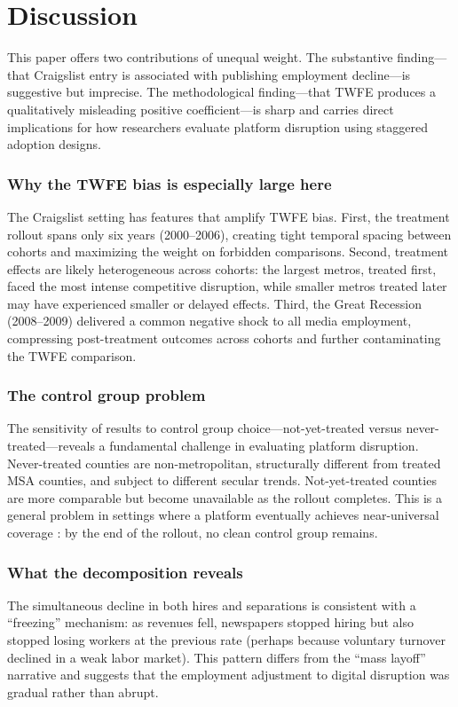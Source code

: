\documentclass[12pt]{article}
\begin{document}



\section{Discussion}

This paper offers two contributions of unequal weight. The substantive finding---that Craigslist entry is associated with publishing employment decline---is suggestive but imprecise. The methodological finding---that TWFE produces a qualitatively misleading positive coefficient---is sharp and carries direct implications for how researchers evaluate platform disruption using staggered adoption designs.

\subsubsection*{Why the TWFE bias is especially large here} The Craigslist setting has features that amplify TWFE bias. First, the treatment rollout spans only six years (2000--2006), creating tight temporal spacing between cohorts and maximizing the weight on forbidden comparisons. Second, treatment effects are likely heterogeneous across cohorts: the largest metros, treated first, faced the most intense competitive disruption, while smaller metros treated later may have experienced smaller or delayed effects. Third, the Great Recession (2008--2009) delivered a common negative shock to all media employment, compressing post-treatment outcomes across cohorts and further contaminating the TWFE comparison.

\subsubsection*{The control group problem} The sensitivity of results to control group choice---not-yet-treated versus never-treated---reveals a fundamental challenge in evaluating platform disruption. Never-treated counties are non-metropolitan, structurally different from treated MSA counties, and subject to different secular trends. Not-yet-treated counties are more comparable but become unavailable as the rollout completes. This is a general problem in settings where a platform eventually achieves near-universal coverage \citep{goldfarb_tucker_2019}: by the end of the rollout, no clean control group remains.

\subsubsection*{What the decomposition reveals} The simultaneous decline in both hires and separations is consistent with a ``freezing'' mechanism: as revenues fell, newspapers stopped hiring but also stopped losing workers at the previous rate (perhaps because voluntary turnover declined in a weak labor market). This pattern differs from the ``mass layoff'' narrative and suggests that the employment adjustment to digital disruption was gradual rather than abrupt.
\end{document}
